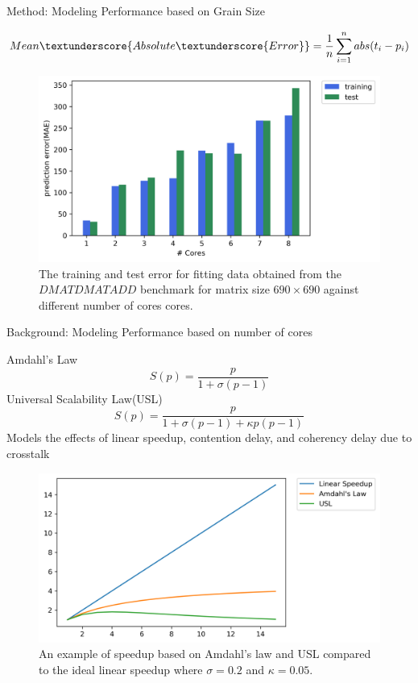 \documentclass[10pt]{beamer}
\begin{document}
\begin{frame}{Method: Modeling Performance based on Grain Size}
	\begin{outline}	
		$$Mean\textunderscore{Absolute\textunderscore{Error}} = \frac{1}{n}\sum_{i=1}^{n} abs({t_i-p_i})$$
		\begin{figure}[H]
			\centering
			\includegraphics[scale=.5]{images/polyfit/error_690_mae.png}
			\caption{The training and test error for fitting data obtained from the $DMATDMATADD$ benchmark for matrix size $690\times690$ against different number of cores cores.}	
			\label{fig32}
		\end{figure}
	\end{outline}
\end{frame}
\begin{frame}{Background: Modeling Performance based on number of cores}
	\begin{outline}
		\1Amdahl's Law
		$$S(p) = \frac{p}{1+\sigma(p-1)}$$
		\1Universal Scalability Law(USL)
		$$S(p) = \frac{p}{1+\sigma(p-1)+\kappa{p}(p-1)}$$
		\2 Models the effects
		of linear speedup, contention delay, and coherency delay due to crosstalk
		\begin{figure}[H]
			\centering
			\includegraphics[scale=0.38]{images/USL.png}
			\caption{An example of speedup based on Amdahl's law and USL compared to the ideal linear speedup where $\sigma=0.2$ and $\kappa=0.05$.}	
			\label{fig_Amdahl}
		\end{figure}
		
		
	\end{outline}
\end{frame}
\end{document}
